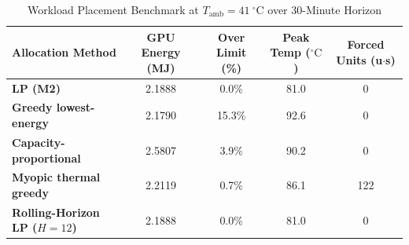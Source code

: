 \begin{table}[h]
\centering
\caption{Workload Placement Benchmark at $T_{\text{amb}} = 41\ ^\circ\text{C}$ over 30-Minute Horizon}
\label{tab:workload_benchmark}
\small
\begin{tabular}{lcccc}
\hline
\textbf{Allocation Method} & \textbf{GPU Energy (MJ)} & \textbf{Over Limit (\%)} & \textbf{Peak Temp ($^\circ\text{C}$)} & \textbf{Forced Units (u$\cdot$s)} \\
\hline
\textbf{LP (M2)} & 2.1888 & 0.0\% & 81.0 & 0 \\
\textbf{Greedy lowest-energy} & 2.1790 & 15.3\% & 92.6 & 0 \\
\textbf{Capacity-proportional} & 2.5807 & 3.9\% & 90.2 & 0 \\
\textbf{Myopic thermal greedy} & 2.2119 & 0.7\% & 86.1 & 122 \\
\textbf{Rolling-Horizon LP ($H=12$)} & 2.1888 & 0.0\% & 81.0 & 0 \\
\hline
\end{tabular}
\end{table}
